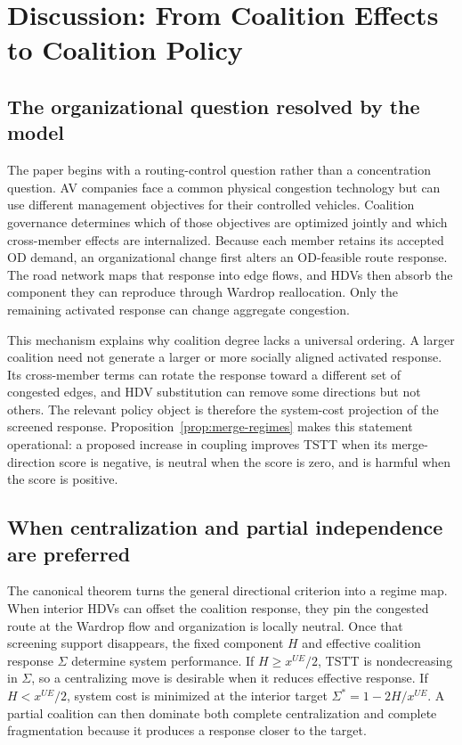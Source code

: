 \section{Discussion: From Coalition Effects to Coalition Policy}\label{sec:discussion}

\subsection{The organizational question resolved by the model}

The paper begins with a routing-control question rather than a concentration
question. AV companies face a common physical congestion technology but can
use different management objectives for their controlled vehicles. Coalition
governance determines which of those objectives are optimized jointly and
which cross-member effects are internalized. Because each member retains its
accepted OD demand, an organizational change first alters an OD-feasible route
response. The road network maps that response into edge flows, and HDVs then
absorb the component they can reproduce through Wardrop reallocation. Only the
remaining activated response can change aggregate congestion.

This mechanism explains why coalition degree lacks a universal ordering. A
larger coalition need not generate a larger or more socially aligned activated
response. Its cross-member terms can rotate the response toward a different
set of congested edges, and HDV substitution can remove some directions but
not others. The relevant policy object is therefore the system-cost projection
of the screened response. Proposition~\ref{prop:merge-regimes} makes this
statement operational: a proposed increase in coupling improves TSTT when its
merge-direction score is negative, is neutral when the score is zero, and is
harmful when the score is positive.

\subsection{When centralization and partial independence are preferred}

The canonical theorem turns the general directional criterion into a regime
map. When interior HDVs can offset the coalition response, they pin the
congested route at the Wardrop flow and organization is locally neutral. Once
that screening support disappears, the fixed component $H$ and effective
coalition response $\Sigma$ determine system performance. If
$H\geq x^{UE}/2$, TSTT is nondecreasing in $\Sigma$, so a centralizing move is
desirable when it reduces effective response. If $H<x^{UE}/2$, system cost is
minimized at the interior target
$\Sigma^*=1-2H/x^{UE}$. A partial coalition can then dominate both complete
centralization and complete fragmentation because it produces a response
closer to the target.

